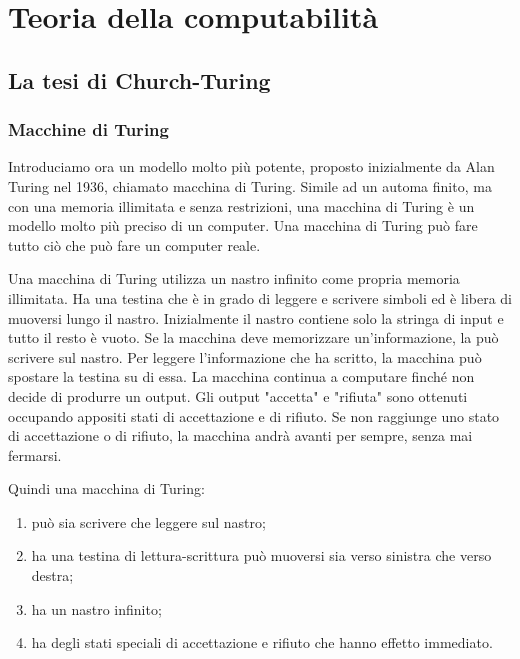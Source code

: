 \part{Teoria della computabilità}
\chapter{La tesi di Church-Turing}
\section{Macchine di Turing}
Introduciamo ora un modello molto più potente, proposto inizialmente da Alan Turing nel 1936, chiamato macchina di Turing. Simile ad un automa finito, ma con una memoria illimitata e senza restrizioni, una macchina di Turing è un modello molto più preciso di un computer. Una macchina di Turing può fare tutto ciò che può fare un computer reale. 

Una macchina di Turing utilizza un nastro infinito come propria memoria illimitata. Ha una testina che è in grado di leggere e scrivere simboli ed è libera di muoversi lungo il nastro. Inizialmente il nastro contiene solo la stringa di input e tutto il resto è vuoto. Se la macchina deve memorizzare un'informazione, la può scrivere sul nastro. Per leggere l'informazione che ha scritto, la macchina può spostare la testina su di essa. La macchina continua a computare finché non decide di produrre un output. Gli output "accetta" e "rifiuta" sono ottenuti occupando appositi stati di accettazione e di rifiuto. Se non raggiunge uno stato di accettazione o di rifiuto, la macchina andrà avanti per sempre, senza mai fermarsi.

Quindi una macchina di Turing:
\begin{enumerate}
    \item può sia scrivere che leggere sul nastro;
    \item ha una testina di lettura-scrittura può muoversi sia verso sinistra che verso destra;
    \item ha un nastro infinito;
    \item ha degli stati speciali di accettazione e rifiuto che hanno effetto immediato.
\end{enumerate}

